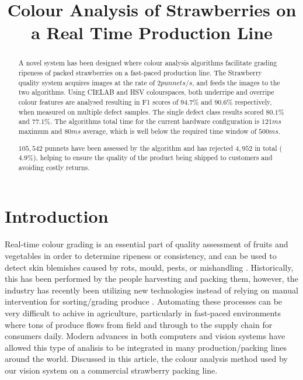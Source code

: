 \documentclass{bmvc2k}
\title{Colour Analysis of Strawberries on a Real Time Production Line}
\begin{document}
\maketitle

\begin{abstract}
A novel system has been designed where colour analysis algorithms facilitate grading ripeness of packed strawberries on a fast-paced production line. The Strawberry quality system acquires images at the rate of $2 punnets/s$, and feeds the images to the two algorithms. Using CIELAB and HSV colourspaces, both underripe and overripe colour features are analysed  resulting in F1 scores of $94.7\%$ and $90.6\%$ respectively, when measured on multiple defect samples. The single defect class results scored $80.1\%$ and $77.1\%$. The algorithms total time for the current hardware configuration is $121ms$ maximum and $80ms$ average, which is well below the required time window of $500ms$.

$105,542$ punnets have been assessed by the algorithm and has rejected $4,952$ in total ($4.9\%$),  helping to ensure the quality of the product being shipped to customers and avoiding costly returns.

\end{abstract}

\section{Introduction}
\label{sec:intro}

Real-time colour grading is an essential part of quality assessment of fruits and vegetables in order to determine ripeness or consistency, and can be used to detect skin blemishes caused by rots, mould, pests, or mishandling \cite{blasco}. Historically, this has been performed by the people harvesting and packing them, however, the industry has recently been utilizing new technologies instead of relying on manual intervention for sorting/grading produce \cite{londhe}. Automating these processes can be very difficult to achive in agriculture, particularly in fast-paced environments where tons of produce flows from field and through to the supply chain for consumers daily. Modern advances in both computers and vision systems have allowed this type of analisis to be integrated in many production/packing lines around the world. Discussed in this article, the colour analysis method used by our vision system on a commercial strawberry packing line.
\end{document}
